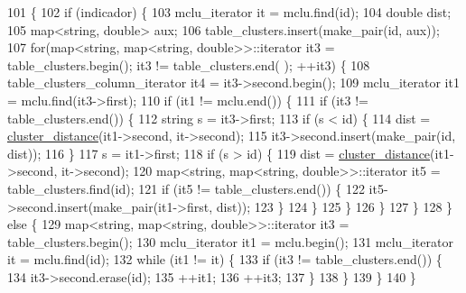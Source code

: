 \begin{DoxyCode}
101                                                                      \{
102     \textcolor{keywordflow}{if} (indicador) \{
103     mclu\_iterator it = mclu.find(\textcolor{keywordtype}{id});
104     \textcolor{keywordtype}{double} dist;
105     map<string, double> aux;
106     table\_clusters.insert(make\_pair(\textcolor{keywordtype}{id}, aux));
107     \textcolor{keywordflow}{for}(map<\textcolor{keywordtype}{string}, map<string, double>>::iterator it3 = table\_clusters.begin(); it3 != table\_clusters.end(
      ); ++it3) \{
108         table\_clusters\_column\_iterator it4 = it3->second.begin();
109         mclu\_iterator it1 = mclu.find(it3->first);
110         \textcolor{keywordflow}{if} (it1 != mclu.end()) \{
111             \textcolor{keywordflow}{if} (it3 != table\_clusters.end()) \{
112                 \textcolor{keywordtype}{string} s = it3->first;
113                 \textcolor{keywordflow}{if} (s < \textcolor{keywordtype}{id}) \{
114                     dist = \hyperlink{class_cjt___clusters_acd0e381a6b4c43933b3c6761febf9b3e}{cluster\_distance}(it1->second, it->second);
115                     it3->second.insert(make\_pair(\textcolor{keywordtype}{id}, dist));
116                 \}                    
117                 s = it1->first;        
118                 \textcolor{keywordflow}{if} (s > \textcolor{keywordtype}{id}) \{
119                     dist = \hyperlink{class_cjt___clusters_acd0e381a6b4c43933b3c6761febf9b3e}{cluster\_distance}(it1->second, it->second);
120                     map<string, map<string, double>>::iterator it5 = table\_clusters.find(\textcolor{keywordtype}{id});  
121                     \textcolor{keywordflow}{if} (it5 != table\_clusters.end()) \{
122                         it5->second.insert(make\_pair(it1->first, dist));
123                     \}                     
124                 \}
125             \}
126         \}
127     \}
128     \} \textcolor{keywordflow}{else} \{
129         map<string, map<string, double>>::iterator it3 = table\_clusters.begin();
130         mclu\_iterator it1 = mclu.begin();
131         mclu\_iterator it = mclu.find(\textcolor{keywordtype}{id});
132         \textcolor{keywordflow}{while} (it1 != it) \{
133             \textcolor{keywordflow}{if} (it3 != table\_clusters.end()) \{
134                 it3->second.erase(\textcolor{keywordtype}{id});
135                 ++it1;
136                 ++it3;
137             \}
138         \}
139     \}
140 \}
\end{DoxyCode}
\mbox{\label{class_cjt___clusters_a3db57ec9903b4f5439679ac9ba41fab1}} 
